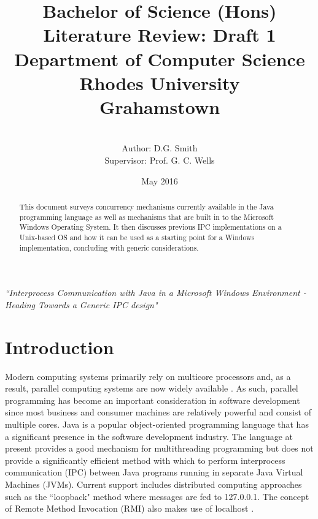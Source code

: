 \documentclass[12pt,a4paper,oneside]{article}
\begin{document}

\title{Bachelor of Science (Hons)
\\Literature Review: Draft 1\\
Department of Computer Science\\Rhodes University\\Grahamstown
}
\author{
\\Author: D.G. Smith
\\Supervisor: Prof. G. C. Wells }
\date {May 2016}
\maketitle
{}
\begin{center}
\it{``Interprocess Communication with Java in a Microsoft Windows Environment - Heading Towards a Generic IPC design"}
\end{center}
\begin{abstract}
  This document surveys concurrency mechanisms currently available in the Java programming language as well as mechanisms that are built in to the Microsoft Windows Operating System. It then discusses previous IPC implementations on a Unix-based OS and how it can
  be used as a starting point for a Windows implementation, concluding with generic
  considerations.
\end{abstract}
\pagebreak
\tableofcontents
\pagebreak
{}

\section{Introduction}
  Modern computing systems primarily rely on multicore processors and, as a result, parallel computing systems are now widely available \citep{garg2005concurrent}. As such, parallel programming has become an important consideration in software development since most business and consumer machines are relatively powerful and consist of multiple cores. Java is a popular object-oriented programming language that has a significant presence in the software development industry. The language at present provides a good mechanism for multithreading programming but does not provide a significantly efficient method with which to perform interprocess communication (IPC) between Java programs running in separate Java Virtual Machines (JVMs). Current support includes distributed computing approaches such as the ``loopback" method where messages are fed to 127.0.0.1. The concept of Remote Method Invocation (RMI) also makes use of localhost \citep{WellsIPCJava}.
\end{document}
